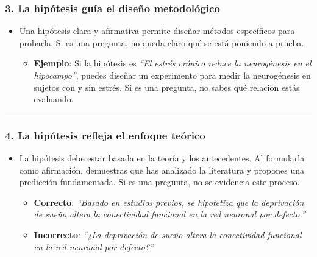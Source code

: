 \documentclass[
]{article}
\providecommand{\tightlist}{%
  \setlength{\itemsep}{0pt}\setlength{\parskip}{0pt}}\usepackage{longtable,booktabs,array}
\begin{document}
\begin{tcolorbox}
\subsubsection{\texorpdfstring{\textbf{3. La hipótesis guía el diseño
metodológico}}{3. La hipótesis guía el diseño metodológico}}\label{la-hipuxf3tesis-guuxeda-el-diseuxf1o-metodoluxf3gico}

\begin{itemize}
\tightlist
\item
  Una hipótesis clara y afirmativa permite diseñar métodos específicos
  para probarla. Si es una pregunta, no queda claro qué se está poniendo
  a prueba.

  \begin{itemize}
  \tightlist
  \item
    \textbf{Ejemplo}: Si la hipótesis es \emph{``El estrés crónico
    reduce la neurogénesis en el hipocampo''}, puedes diseñar un
    experimento para medir la neurogénesis en sujetos con y sin estrés.
    Si es una pregunta, no sabes qué relación estás evaluando.
  \end{itemize}
\end{itemize}

\begin{center}\rule{0.5\linewidth}{0.5pt}\end{center}

\subsubsection{\texorpdfstring{\textbf{4. La hipótesis refleja el
enfoque
teórico}}{4. La hipótesis refleja el enfoque teórico}}\label{la-hipuxf3tesis-refleja-el-enfoque-teuxf3rico}

\begin{itemize}
\tightlist
\item
  La hipótesis debe estar basada en la teoría y los antecedentes. Al
  formularla como afirmación, demuestras que has analizado la literatura
  y propones una predicción fundamentada. Si es una pregunta, no se
  evidencia este proceso.

  \begin{itemize}
  \tightlist
  \item
    \textbf{Correcto}: \emph{``Basado en estudios previos, se hipotetiza
    que la deprivación de sueño altera la conectividad funcional en la
    red neuronal por defecto.''}\\
  \item
    \textbf{Incorrecto}: \emph{``¿La deprivación de sueño altera la
    conectividad funcional en la red neuronal por defecto?''}
  \end{itemize}
\end{itemize}


\end{tcolorbox}
\end{document}
